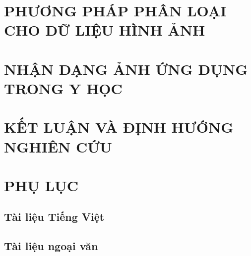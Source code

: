 \documentclass[a4paper,oneside]{report}			%
\theoremstyle{plain}
\theoremstyle{plain}
\theoremstyle{nonumberplain}
\begin{document}
\chapter[PHƯƠNG PHÁP PHÂN LOẠI CHO DỮ LIỆU HÌNH ẢNH]{PHƯƠNG PHÁP PHÂN LOẠI \\CHO DỮ LIỆU HÌNH ẢNH}
	

\chapter{NHẬN DẠNG ẢNH ỨNG DỤNG TRONG Y HỌC}
	

\chapter{KẾT LUẬN VÀ ĐỊNH HƯỚNG NGHIÊN CỨU}
	

\chapter{PHỤ LỤC}\label{phuluc}




\begin{thebibliography}{10}
	
	\section*{Tài liệu Tiếng Việt}

	\section*{Tài liệu ngoại văn}	

\end{thebibliography}


\printindex
\end{document}
